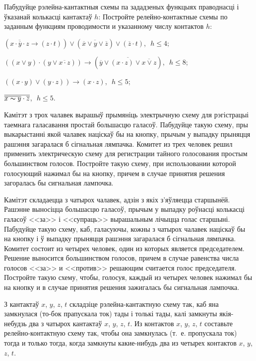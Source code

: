 \begin{problemList}
\problemItemWithCommonPart
{Пабудуйце рэлейна-кантактныя схемы па зададзеных функцыях праводнасці і ўказанай колькасці кантактаў $h$:}
{Постройте релейно-контактные схемы по заданным функциям проводимости и указанному числу контактов $h$:}
{%
\begin{belarusianEnumerate}
	\item $(\overline{x \cdot \overline{y} \cdot z} \to (z \cdot t)) \vee
	(\overline{\overline{x} \vee y \vee \overline{z}}) \vee (\overline{z} \cdot t)$,\,\, $h \le 4$;
	
	\item $((x \vee y) \cdot (y \vee \overline{x \cdot z})) \to (\overline{\overline{y} \vee
		(x \cdot z) \vee \overline{x \vee z}})$,\,\, $h \le 8$;
	
	\item $((x \cdot y) \vee (y \cdot z)) \to (x \cdot z)$,\,\, $h \le 5$;
	
	\item $\overline{\overline{x \thicksim y} \cdot \overline{z}}$,\,\, $h \le 5$.
\end{belarusianEnumerate}%
}

\bigskip

\problemItemSimple
{Камітэт з трох чалавек вырашыў прымяніць электрычную схему для рэгістрацыі таемнага галасавання простай большасцю галасоў. Пабудуйце такую схему, пры выкарыстанні якой чалавек націскаў бы на кнопку, прычым у выпадку прыняцця рашэння загаралася б сігнальная лямпачка.}
{Комитет из трех человек решил применить электрическую схему для регистрации тайного голосования простым большинством голосов. Постройте такую схему, при использовании которой голосующий нажимал бы на кнопку, причем в случае принятия решения загоралась бы сигнальная лампочка.}

\bigskip

\problemItemSimple
{Камітэт складаецца з чатырох чалавек, адзін з якіх з'яўляецца старшынёй. Рашэнне выносіцца большасцю галасоў, прычым у выпадку роўнасці колькасці галасоў <<за>> і <<супраць>> вырашальным лічыцца голас старшыні. Пабудуйце такую схему, каб, галасуючы, кожны з чатырох чалавек націскаў бы на кнопку і ў выпадку прыняцця рашэння загаралася б сігнальная лямпачка.}
{Комитет состоит из четырех человек, один из которых является председателем. Решение выносится большинством голосов, причем в случае равенства числа голосов <<за>> и <<против>> решающим считается голос председателя. Постройте такую схему, чтобы, голосуя, каждый из четырех человек нажимал бы на кнопку и в случае принятия решения зажигалась бы сигнальная лампочка.}
	
 \bigskip
 
 \problemItemSimple
 {З кантактаў $x$, $y$, $z$, $t$ складзіце рэлейна-кантактную схему так, каб яна замкнулася (то-бок прапускала ток) тады і толькі тады, калі замкнуты якія-небудзь два з чатырох кантактаў $x$, $y$, $z$, $t$.}
 {Из контактов $x$, $y$, $z$, $t$ составьте релейно-контактную схему так, чтобы она замкнулась (т.~е. пропускала ток) тогда и только тогда, когда замкнуты какие-нибудь два из четырех контактов $x$, $y$, $z$, $t$.}
 
\end{problemList}

